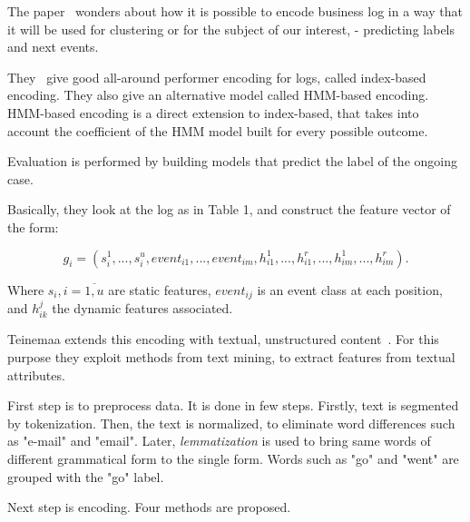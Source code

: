 The paper~\cite{Leontjeva2015} wonders about how it is possible to encode business log in a way that it will be used for clustering or for the subject of our interest, - predicting labels and next events.

They~\cite{Leontjeva2015} give good all-around performer encoding for logs, called index-based encoding. They also give an alternative model called HMM-based encoding. HMM-based encoding is a direct extension to index-based, that takes into account the coefficient of the HMM model built for every possible outcome.

Evaluation is performed by building models that predict the label of the ongoing case.

Basically, they look at the log as in Table 1, and construct the feature vector of the form:

\[g_i = (s_i^1,...,s_i^u,event_{i1},...,event_{im},h_{i1}^1,...,h_{i1}^r,...,h_{im}^1,...,h_{im}^r).\]

Where $s_i, i=\overline{1,u}$ are static features, $event_{ij}$ is an event class at each position, and $h_{ik}^{j}$ the dynamic features associated. 

Teinemaa extends this encoding with textual, unstructured content~\cite{Teinemaa2016}. For this purpose they exploit methods from text mining, to extract features from textual attributes.

First step is to preprocess data. It is done in few steps. Firstly, text is segmented by tokenization. Then, the text is normalized, to eliminate word differences such as "e-mail" and "email". Later, \textit{lemmatization} is used to bring same words of different grammatical form to the single form. Words such as "go" and "went" are grouped with the "go" label.

Next step is encoding. Four methods are proposed.

